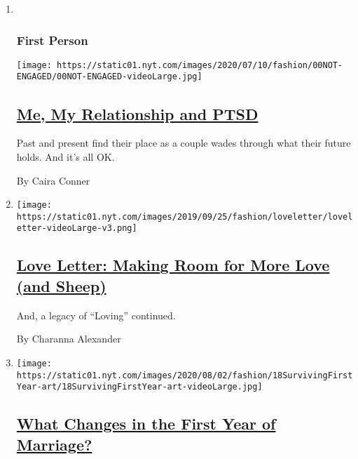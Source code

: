 \begin{enumerate}
\def\labelenumi{\arabic{enumi}.}
\item ~
  \hypertarget{first-person}{%
  \subsubsection{First Person}\label{first-person}}

  \texttt{[image: https://static01.nyt.com/images/2020/07/10/fashion/00NOT-ENGAGED/00NOT-ENGAGED-videoLarge.jpg]}

  \hypertarget{me-my-relationship-and-ptsd}{%
  \subsection{\texorpdfstring{\href{/2020/07/25/fashion/weddings/me-my-relationship-and-ptsd.html}{Me,
  My Relationship and
  PTSD}}{Me, My Relationship and PTSD}}\label{me-my-relationship-and-ptsd}}

  Past and present find their place as a couple wades through what their
  future holds. And it's all OK.

  By Caira Conner
\item
  \texttt{[image: https://static01.nyt.com/images/2019/09/25/fashion/loveletter/loveletter-videoLarge-v3.png]}

  \hypertarget{love-letter-making-room-for-more-love-and-sheep}{%
  \subsection{\texorpdfstring{\href{/2020/07/31/fashion/weddings/love-letter-newsletter-making-room-for-more-love-and-sheep.html}{Love
  Letter: Making Room for More Love (and
  Sheep)}}{Love Letter: Making Room for More Love (and Sheep)}}\label{love-letter-making-room-for-more-love-and-sheep}}

  And, a legacy of ``Loving'' continued.

  By Charanna Alexander
\item
  \texttt{[image: https://static01.nyt.com/images/2020/08/02/fashion/18SurvivingFirstYear-art/18SurvivingFirstYear-art-videoLarge.jpg]}

  \hypertarget{what-changes-in-the-first-year-of-marriage}{%
  \subsection{\texorpdfstring{\href{/2020/07/23/fashion/weddings/what-changes-in-the-first-year-of-marriage.html}{What
  Changes in the First Year of
  Marriage?}}{What Changes in the First Year of Marriage?}}\label{what-changes-in-the-first-year-of-marriage}}


\end{enumerate}
